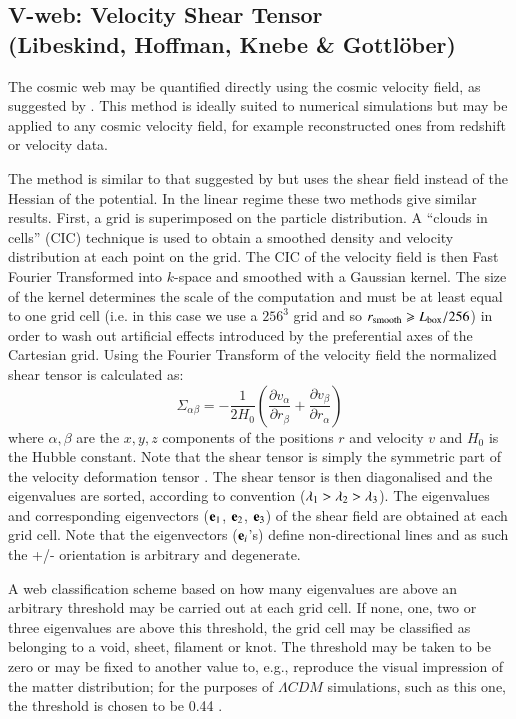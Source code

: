 \subsection{V-web: Velocity Shear Tensor\\ \hskip 0.75cm (Libeskind, Hoffman, Knebe \& Gottl\"ober)}
\label{section:libeskind}
The cosmic web may be quantified directly using the cosmic velocity field, as suggested by \cite{2012MNRAS.425.2049H}. This method is ideally suited to numerical simulations but may be applied to any cosmic velocity field, for example reconstructed ones from redshift or velocity data.

The method is similar to that suggested by \cite{hahn2007a} but uses the shear field instead of the Hessian of the potential. In the linear regime these two methods give similar results. First, a grid is superimposed on the particle distribution. A ``clouds in cells'' (CIC) technique is used to obtain a smoothed density and velocity distribution at each point on the grid. The CIC of the velocity field is then Fast Fourier Transformed into $k$-space and smoothed with a Gaussian kernel. The size of the kernel determines the scale of the computation and must be at least equal to one grid cell (i.e. in this case we use a $256^3$ grid and so $r_{\rm smooth}\ge L_{\rm box}/256$) in order to wash out artificial effects introduced by the preferential axes of the Cartesian grid. Using the Fourier Transform of the velocity field the normalized shear tensor is calculated as:
\begin{equation}
\Sigma_{\alpha\beta} = -\frac{1}{2H_{0}}\left(\frac{\partial v_{\alpha}}{\partial r_{\beta}}+\frac{\partial v_{\beta}}{\partial r_{\alpha}}\right)
\end{equation}
where $\alpha, \beta$ are the $x,y,z$ components of the positions $r$ and velocity $v$ and $H_{0}$ is the Hubble constant. Note that the shear tensor is simply the symmetric part of the velocity deformation tensor \citep[the anti-symmetric part being the curl or vorticity, see][]{2013ApJ...766L..15L,2014MNRAS.441.1974L}. The shear tensor is then diagonalised and the eigenvalues are sorted, according to convention ($\lambda_{\rm1}>\lambda_{\rm2}>\lambda_{\rm3}$). The eigenvalues and corresponding eigenvectors (${\bf e}_{\rm 1}$, ${\bf e}_{\rm 2}$, ${\bf e}_{\rm 3}$) of the shear field are obtained at each grid cell. Note that the eigenvectors (${\bf e}_{i}$'s) define non-directional lines and as such the +/- orientation is arbitrary and degenerate.

A web classification scheme based on how many eigenvalues are above an arbitrary threshold may be carried out at each grid cell. If none, one, two or three eigenvalues are above this threshold, the grid cell may be classified as belonging to a void, sheet, filament or knot. The threshold may be taken to be zero \citep[as in][]{hahn2007a} or may be fixed to another value to, e.g., reproduce the visual impression of the matter distribution; for the purposes of $\Lambda CDM$ simulations, such as this one, the threshold is chosen to be 0.44 \citep{forero2009,2012MNRAS.421L.137L,2013MNRAS.428.2489L,2014MNRAS.443.1274L}.

